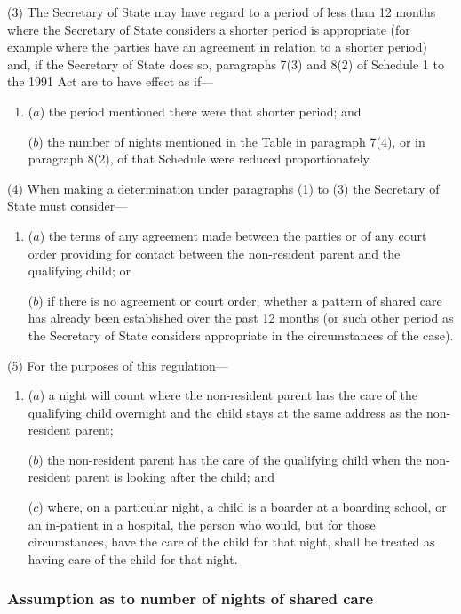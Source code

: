 \documentclass[12pt,a4paper]{article}
\begin{document}
(3) The Secretary of State may have regard to a period of less than 12 months where the Secretary of State considers a shorter period is appropriate (for example where the parties have an agreement in relation to a shorter period) and, if the Secretary of State does so, paragraphs 7(3) and 8(2) of Schedule 1 to the 1991 Act are to have effect as if—
\begin{enumerate}\item[]
($a$) the period mentioned there were that shorter period; and

($b$) the number of nights mentioned in the Table in paragraph 7(4), or in paragraph 8(2), of that Schedule were reduced proportionately.
\end{enumerate}

(4) When making a determination under paragraphs (1) to (3) the Secretary of State must consider—
\begin{enumerate}\item[]
($a$) the terms of any agreement made between the parties or of any court order providing for contact between the non-resident parent and the qualifying child; or

($b$) if there is no agreement or court order, whether a pattern of shared care has already been established over the past 12 months (or such other period as the Secretary of State considers appropriate in the circumstances of the case).
\end{enumerate}

(5) For the purposes of this regulation—
\begin{enumerate}\item[]
($a$) a night will count where the non-resident parent has the care of the qualifying child overnight and the child stays at the same address as the non-resident parent;

($b$) the non-resident parent has the care of the qualifying child when the non-resident parent is looking after the child; and

($c$) where, on a particular night, a child is a boarder at a boarding school, or an in-patient in a hospital, the person who would, but for those circumstances, have the care of the child for that night, shall be treated as having care of the child for that night.
\end{enumerate}

\subsubsection[47. Assumption as to number of nights of shared care]{Assumption as to number of nights of shared care}
\end{document}

